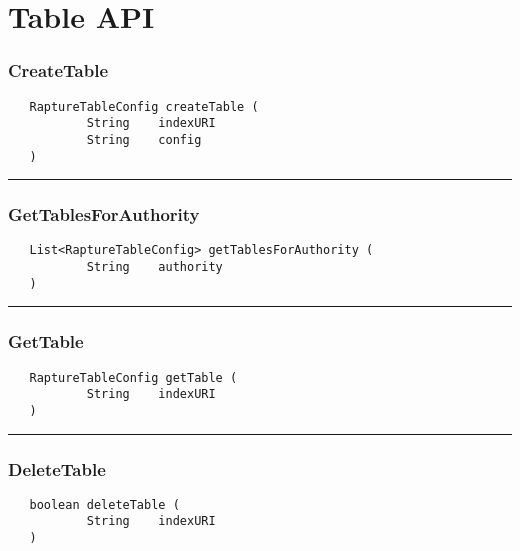 \chapter{Table API}

\subsection{CreateTable}
\label{Api:CreateTable}
\begin{verbatim}
   RaptureTableConfig createTable (
           String    indexURI
           String    config
   )
\end{verbatim}



\rule{15cm}{2pt}
\subsection{GetTablesForAuthority}
\label{Api:GetTablesForAuthority}
\begin{verbatim}
   List<RaptureTableConfig> getTablesForAuthority (
           String    authority
   )
\end{verbatim}



\rule{15cm}{2pt}
\subsection{GetTable}
\label{Api:GetTable}
\begin{verbatim}
   RaptureTableConfig getTable (
           String    indexURI
   )
\end{verbatim}



\rule{15cm}{2pt}
\subsection{DeleteTable}
\label{Api:DeleteTable}
\begin{verbatim}
   boolean deleteTable (
           String    indexURI
   )
\end{verbatim}



